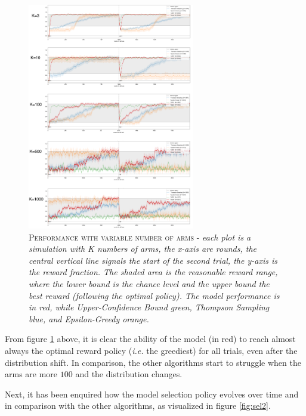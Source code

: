 \begin{figure}[ht]
    \centering
    \includegraphics[width=0.65\textwidth]{figures/drawing.png}
    \caption{\textsc{Performance with variable number of arms} - \textit{each plot is a simulation with K numbers of arms, the x-axis are rounds, the central vertical line signals the start of the second trial, the y-axis is the reward fraction.
            The shaded area is the reasonable reward
    range, where the lower bound is the chance level and the upper bound the best reward (following the optimal policy). The model performance is in red, while Upper-Confidence Bound green, Thompson Sampling blue, and Epsilon-Greedy orange. }}
\label{fig:zero_1}
\end{figure}


\noindent From figure \ref{fig:zero_1} above, it is clear the ability of the model (in red) to reach almost always the optimal reward policy (\textit{i.e.} the greediest) for all trials, even after the distribution shift.
In comparison, the other algorithms start to struggle when the arms are more $100$ and the distribution changes.

Next, it has been enquired how the model selection policy evolves over time and in comparison with the other algorithms, as visualized in figure \ref{fig:sel2}.

